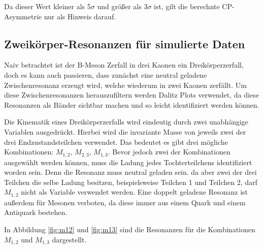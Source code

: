 Da dieser Wert kleiner als 5$\sigma$ und gr\"o\ss er als 3$\sigma$ ist, gilt die berechnte CP-Asymmetrie nur als Hinweis darauf.

\subsection{Zweik\"orper-Resonanzen f\"ur simulierte Daten}
\label{sec:resosim}
Naiv betrachtet ist der B-Meson Zerfall in drei Kaonen ein Dreik\"orperzerfall, doch es kann auch passieren, dass zun\"achst eine neutral geladene Zwischenresonanz erzeugt wird, welche wiederum in zwei Kaonen zerf\"allt.
Um diese Zwischenresonanzen herauszufiltern werden Dalitz Plots verwendet, da diese Resonanzen als B\"ander sichtbar machen und so leicht identifiziert werden k\"onnen.

Die Kinematik eines Dreik\"orperzerfalls wird eindeutig durch zwei unabh\"angige Variablen ausgedr\"uckt. Hierbei wird die invariante Masse von jeweils zwei der drei Endzustandsteilchen verwendet.
Das bedeutet es gibt drei m\"ogliche Kombinationen:
$M_{1,2}$, $M_{2,3}$, $M_{1,3}$.
Bevor jedoch zwei der Kombinationen ausgew\"ahlt werden k\"onnen, muss die Ladung jedes Tochterteilchens identifiziert worden sein.
Denn die Resonanz muss neutral geladen sein. da aber zwei der drei Teilchen die selbe Ladung besitzen, beispielsweise Teilchen 1 und Teilchen 2, darf $M_{1,2}$ nicht als Variable verwendet werden.
Eine doppelt geladene Resonanz ist au\ss erdem f\"ur Mesonen verboten, da diese immer aus einem Quark und einem Antiquark bestehen.

In Abbildung \ref{fig:m12} und \ref{fig:m13} sind die Resonanzen f\"ur die Kombinationen $M_{1,2}$ und $M_{1,3}$ dargestellt.

